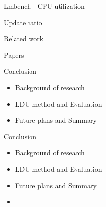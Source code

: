 \documentclass[english]{beamer} %
\begin{document}
\begin{frame}{Lmbench - CPU utilization}
\end{frame}



\begin{frame}{Update ratio}
\end{frame}


\begin{frame}{Related work}

\end{frame}


\begin{frame}{Papers}

\end{frame}


\begin{frame}{Conclusion}
	\begin{itemize}
	\item Background of research 
	\item LDU method and Evaluation
	\item Future plans and Summary
	\end{itemize}
\end{frame}


\begin{frame}{Conclusion}
    \begin{itemize}
    \item Background of research 
    \item LDU method and Evaluation
    \item Future plans and Summary
    \item {}
    \end{itemize}
\end{frame}
\end{document}
